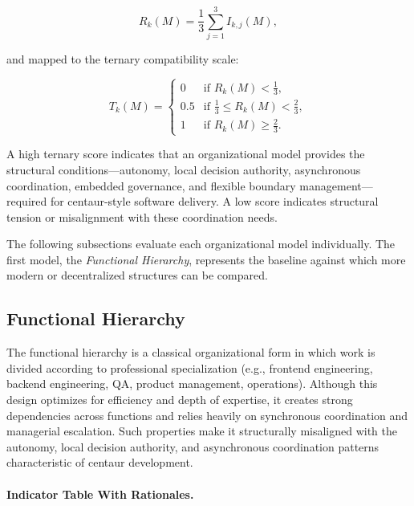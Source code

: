 \documentclass[11pt, a4paper, twocolumn]{article} %
\begin{document}
\[
R_k(M) = \frac{1}{3}\sum_{j=1}^{3} I_{k,j}(M),
\]

and mapped to the ternary compatibility scale:

\[
T_k(M) =
\begin{cases}
0 & \text{if } R_k(M) < \frac{1}{3}, \\
0.5 & \text{if } \frac{1}{3} \le R_k(M) < \frac{2}{3}, \\
1 & \text{if } R_k(M) \ge \frac{2}{3}.
\end{cases}
\]

A high ternary score indicates that an organizational model provides the
structural conditions---autonomy, local decision authority, asynchronous
coordination, embedded governance, and flexible boundary management---required for
centaur-style software delivery. A low score indicates structural tension or
misalignment with these coordination needs.

The following subsections evaluate each organizational model individually.    
The first model, the \emph{Functional Hierarchy}, represents the baseline
against which more modern or decentralized structures can be compared.

\newpage
\subsection*{Functional Hierarchy}

The functional hierarchy is a classical organizational form in which work is
divided according to professional specialization (e.g., frontend engineering,
backend engineering, QA, product management, operations). Although this design
optimizes for efficiency and depth of expertise, it creates strong dependencies
across functions and relies heavily on synchronous coordination and managerial
escalation. Such properties make it structurally misaligned with the autonomy,
local decision authority, and asynchronous coordination patterns characteristic
of centaur development.

\paragraph{Indicator Table With Rationales.}
\end{document}
